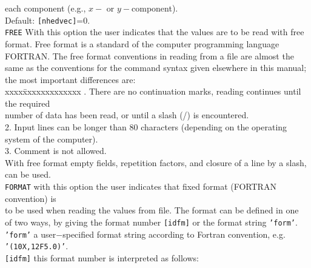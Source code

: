 \documentclass[12pt]{book}
\begin{document}
\begin{tabbing}
                       each component (e.g., $x-$ or $y-$component).\\
                       Default: {\tt [nhedvec]}=0.\-\\
{\tt FREE}          \> With this option the user indicates that the values are to be read with free\+\\
                       format. Free format is a standard of the computer programming language\\
                       FORTRAN. The free format conventions in reading from a file are almost the\\
                       same as the conventions for the command syntax given elsewhere in this manual;\\
                       the most important differences are:\\
                       \pushtabs
                       xxxx\=xxxxxxxxxxxxx . \> There are no continuation marks, reading continues until the required\+\\
                             number of data has been read, or until a slash (/) is encountered.\-\\
                       2. \> Input lines can be longer than 80 characters (depending on the operating\+\\
                             system of the computer).\-\\
                       3. \> Comment is not allowed.\\
                       \poptabs
                       With free format empty fields, repetition factors, and closure of a line by a slash,\\
                       can be used.\-\\
{\tt FORMAT}        \> with this option the user indicates that fixed format (FORTRAN convention) is\+\\
                       to be used when reading the values from file. The format can be defined in one\\
                       of two ways, by giving the format number {\tt [idfm]} or the format string {\tt 'form'}.\-\\
{\tt 'form'}        \> a user$-$specified format string according to Fortran convention, e.g.\+\\
                       {\tt '(10X,12F5.0)'}.\-\\
{\tt [idfm]}        \> this format number is interpreted as follows:
                       \pushtabs

\end{tabbing}
\end{document}
